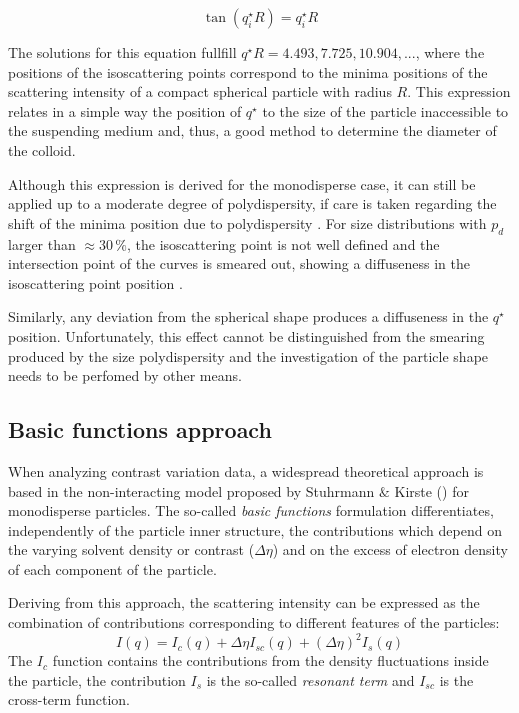 \begin{equation}
        \label{eq:isoscattering}
        \tan(q^{\star}_iR)=q^{\star}_iR
\end{equation}

The solutions for this equation fullfill $q^{\star} R =4.493, 7.725, 10.904, ...$, where the positions of the isoscattering points correspond to the minima positions of the scattering intensity of a compact spherical particle with radius \( R \). This expression relates in a simple way the position of $q^{\star}$ to the size of the particle inaccessible to the suspending medium and, thus, a good method to determine the diameter of the colloid.

Although this expression is derived for the monodisperse case, it can still be applied up to a moderate degree of polydispersity, if care is taken regarding the shift of the minima position due to polydispersity \citep{beurten_polydispersity_1981}. For size distributions with \( p_d\) larger than \( \approx 30\,\% \), the isoscattering point is not well defined and the intersection point of the curves is smeared out, showing a diffuseness in the isoscattering point position \citep{kawaguchi_isoscattering_1992}.

Similarly, any deviation from the spherical shape produces a diffuseness in the $q^{\star}$ position. Unfortunately, this effect cannot be distinguished from the smearing produced by the size polydispersity and the investigation of the particle shape needs to be perfomed by other means.


\subsection{Basic functions approach}
\label{sec:basic_functions_theory}
When analyzing contrast variation data, a widespread theoretical approach is based in the non-interacting model proposed by Stuhrmann $\&$ Kirste (\citeyear{stuhrmann_elimination_1965,stuhrmann_elimination_1967}) for monodisperse particles. The so-called \emph{basic functions} formulation differentiates, independently of the particle inner structure, the contributions which depend on the varying solvent density or contrast (\(\Delta\eta\)) and on the excess of electron density of each component of the particle. 

Deriving from this approach, the scattering intensity can be expressed as the combination of contributions corresponding to different features of the particles:
\begin{equation}
\label{eq:intensity_contrast}
I(q)=I_c(q)+\Delta\eta I_{sc}(q)+(\Delta\eta)^2 I_{s}(q)
\end{equation}
The $I_c$ function contains the contributions from the density fluctuations inside the particle, the contribution $I_s$ is the so-called \emph{resonant term} and $I_{sc}$ is the cross-term function.



